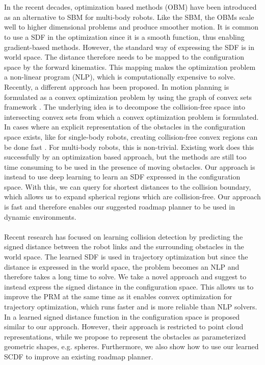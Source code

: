 \documentclass[../main.tex]{subfiles}
\begin{document}
\\\\
In the recent decades, optimization based methods (OBM) \citep{chomp, schulman, itomp, stomp} have been introduced as an alternative to SBM for multi-body robots. Like the SBM, the OBMs scale well to higher dimensional problems and produce smoother motion. It is common to use a SDF in the optimization since it is a smooth function, thus enabling gradient-based methods. However, the standard way of expressing the SDF is in world space. The distance therefore needs to be mapped to the configuration space by the forward kinematics. This mapping makes the optimization problem a non-linear program (NLP), which is computationally expensive to solve. Recently, a different approach has been proposed. In \cite{mp_gcs} motion planning is formulated as a convex optimization problem by using the graph of convex sets framework \citep{gcs}. The underlying idea is to decompose the collision-free space into intersecting convex sets from which a convex optimization problem is formulated. In cases where an explicit representation of the obstacles in the configuration space exists, like for single-body robots, creating collision-free convex regions can be done fast \citep{iris}. For multi-body robots, this is non-trivial. Existing work does this successfully \citep{iris_nlp, iris_c} by an optimization based approach, but the methods are still too time consuming to be used in the presence of moving obstacles. Our approach is instead to use deep learning to learn an SDF expressed in the configuration space. With this, we can query for shortest distances to the collision boundary, which allows us to expand spherical regions which are collision-free. Our approach is fast and therefore enables our suggested roadmap planner to be used in dynamic environments.
\\\\
Recent research has focused on learning collision detection \citep{fk_kernel_distance, diffco, graphdistnet} by predicting the signed distance between the robot links and the surrounding obstacles in the world space. The learned SDF is used in trajectory optimization but since the distance is expressed in the world space, the problem becomes an NLP and therefore takes a long time to solve. We take a novel approach and suggest to instead express the signed distance in the configuration space. This allows us to improve the PRM at the same time as it enables convex optimization for trajectory optimization, which runs faster and is more reliable than NLP solvers. In \cite{cspf} a learned signed distance function in the configuration space is proposed similar to our approach. However, their approach is restricted to point cloud representations, while we propose to represent the obstacles as parameterized geometric shapes, e.g. spheres. Furthermore, we also show how to use our learned SCDF to improve an existing roadmap planner.
\end{document}
